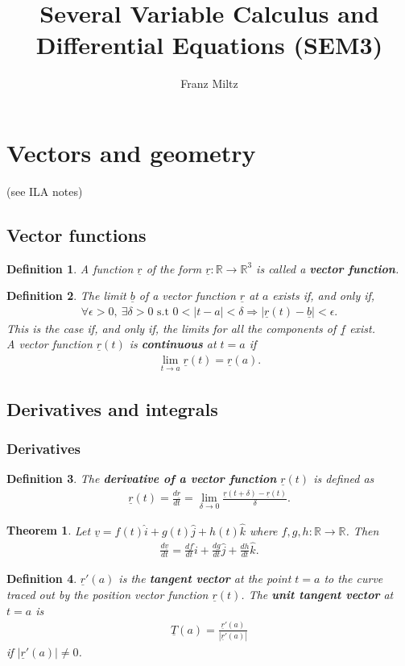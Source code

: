 \documentclass{article}
\theoremstyle{sltheorem}
\newtheorem{definition}{Definition}[section]
\newtheorem{theorem}{Theorem}[section]
\newcommand{\R}{\mathbb{R}}
\newcommand{\st}{\text{ s.t }}
\newcommand{\ih}{\widehat i}
\newcommand{\jh}{\widehat j}
\newcommand{\kh}{\widehat k}
\renewcommand{\vec}{\underline}
\newcommand*\B[1]{\textbf{#1}}
\begin{document}
\title{Several Variable Calculus and Differential Equations (SEM3)}
\author{Franz Miltz}
\maketitle
\tableofcontents
\pagebreak
\section{Vectors and geometry}
(see ILA notes)
\setcounter{subsection}{4}
\subsection{Vector functions}
\begin{definition}
    A function $\vec r$ of the form $\vec r: \R \to \R^3$ is called a \B{vector function}.
\end{definition}
\begin{definition}
    The limit $\vec b$ of a vector function $\vec r$ at $a$ exists if, and only if,
    \begin{align*}
        \forall \epsilon > 0,\: \exists \delta > 0 \st 0 < |t-a| < \delta \Rightarrow |\vec r(t) - \vec b|<\epsilon.
    \end{align*}
    This is the case if, and only if, the limits for all the components of $\vec f$ exist.\\
    A vector function $\vec r(t)$ is \B{continuous} at $t=a$ if
    \begin{align*}
        \lim_{t\to a} \vec r (t) = \vec r (a). 
    \end{align*}
\end{definition}
\subsection{Derivatives and integrals}
\subsubsection{Derivatives}
\begin{definition}
    The \B{derivative of a vector function} $\vec r(t)$ is defined as
    \begin{align*}
        \vec r(t) = \frac{d\vec r}{dt} = \lim_{\delta \to 0} \frac{\vec r(t+\delta)-\vec r(t)}{\delta}.
    \end{align*}
\end{definition}
\begin{theorem}
    Let $\vec v = f(t)\ih + g(t)\jh + h(t)\kh$ where $f,g,h: \R\to\R$. Then
    \begin{align*}
        \frac{d\vec v}{dt} = \frac{df}{dt}\ih + \frac{dg}{dt}\jh + \frac{dh}{dt}\kh.
    \end{align*}
\end{theorem}
\begin{definition}
    $\vec r'(a)$ is the \B{tangent vector} at the point $t=a$ to the curve traced out by the position vector function $\vec r(t)$.
    The \B{unit tangent vector} at $t=a$ is
    \begin{align*}
        \vec T(a) = \frac{\vec r'(a)}{|\vec r'(a)|}
    \end{align*}
    if $|\vec r'(a)| \not= 0$.
\end{definition}
\end{document}
